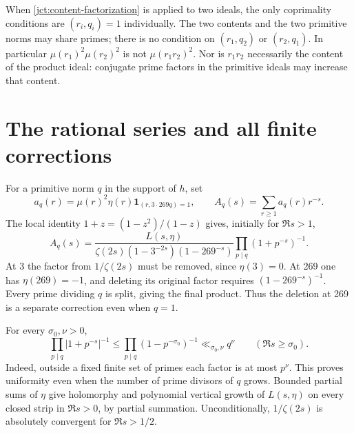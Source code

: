 When \eqref{jct:content-factorization} is applied to two ideals,
the only coprimality conditions are \((r_i,q_i)=1\) individually.
The two contents and the two primitive norms may share primes;
there is no condition on \((r_1,q_2)\) or \((r_2,q_1)\).
In particular \(\mu(r_1)^2\mu(r_2)^2\) is not
\(\mu(r_1r_2)^2\).
Nor is \(r_1r_2\) necessarily the content of the product ideal:
conjugate prime factors in the primitive ideals may increase
that content.

\section{The rational series and all finite corrections}
For a primitive norm \(q\) in the support of \(h\), set
\[
 a_q(r)=\mu(r)^2\eta(r)\mathbf1_{(r,3\cdot269q)=1},\qquad
 A_q(s)=\sum_{r\ge1}a_q(r)r^{-s}.
\]
The local identity \(1+z=(1-z^2)/(1-z)\) gives, initially for
\(\Re s>1\),
\begin{equation}
 A_q(s)=\frac{L(s,\eta)}
 {\zeta(2s)(1-3^{-2s})(1-269^{-s})}
 \prod_{p\mid q}(1+p^{-s})^{-1}.
 \label{jct:rational-series}
\end{equation}
At 3 the factor from \(1/\zeta(2s)\) must be removed, since
\(\eta(3)=0\).  At 269 one has \(\eta(269)=-1\), and
deleting its original factor requires \((1-269^{-s})^{-1}\).
Every prime dividing \(q\) is split, giving the final product.
Thus the deletion at 269 is a separate correction even when
\(q=1\).

For every \(\sigma_0,\nu>0\),
\begin{equation}
 \prod_{p\mid q}|1+p^{-s}|^{-1}
 \le\prod_{p\mid q}(1-p^{-\sigma_0})^{-1}
 \ll_{\sigma_0,\nu}q^\nu\qquad(\Re s\ge\sigma_0).
 \label{jct:q-uniformity}
\end{equation}
Indeed, outside a fixed finite set of primes each factor is at
most \(p^\nu\).  This proves uniformity even when the number of
prime divisors of \(q\) grows.
Bounded partial sums of \(\eta\) give holomorphy and polynomial
vertical growth of \(L(s,\eta)\) on every closed strip in
\(\Re s>0\), by partial summation.
Unconditionally, \(1/\zeta(2s)\) is absolutely convergent for
\(\Re s>1/2\).

